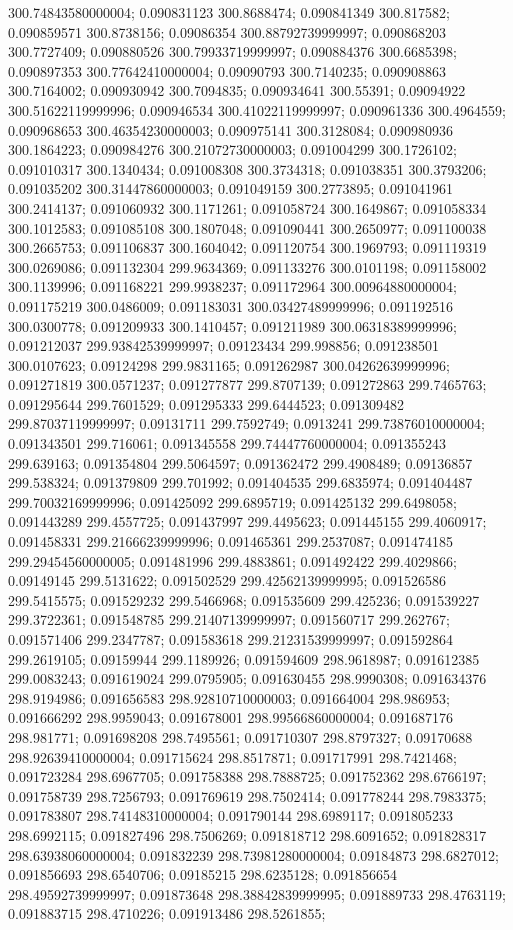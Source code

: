 300.74843580000004; 0.090831123 300.8688474; 0.090841349 300.817582; 0.090859571 300.8738156; 0.09086354 300.88792739999997; 0.090868203 300.7727409; 0.090880526 300.79933719999997; 0.090884376 300.6685398; 0.090897353 300.77642410000004; 0.09090793 300.7140235; 0.090908863 300.7164002; 0.090930942 300.7094835; 0.090934641 300.55391; 0.09094922 300.51622119999996; 0.090946534 300.41022119999997; 0.090961336 300.4964559; 0.090968653 300.46354230000003; 0.090975141 300.3128084; 0.090980936 300.1864223; 0.090984276 300.21072730000003; 0.091004299 300.1726102; 0.091010317 300.1340434; 0.091008308 300.3734318; 0.091038351 300.3793206; 0.091035202 300.31447860000003; 0.091049159 300.2773895; 0.091041961 300.2414137; 0.091060932 300.1171261; 0.091058724 300.1649867; 0.091058334 300.1012583; 0.091085108 300.1807048; 0.091090441 300.2650977; 0.091100038 300.2665753; 0.091106837 300.1604042; 0.091120754 300.1969793; 0.091119319 300.0269086; 0.091132304 299.9634369; 0.091133276 300.0101198; 0.091158002 300.1139996; 0.091168221 299.9938237; 0.091172964 300.00964880000004; 0.091175219 300.0486009; 0.091183031 300.03427489999996; 0.091192516 300.0300778; 0.091209933 300.1410457; 0.091211989 300.06318389999996; 0.091212037 299.93842539999997; 0.09123434 299.998856; 0.091238501 300.0107623; 0.09124298 299.9831165; 0.091262987 300.04262639999996; 0.091271819 300.0571237; 0.091277877 299.8707139; 0.091272863 299.7465763; 0.091295644 299.7601529; 0.091295333 299.6444523; 0.091309482 299.87037119999997; 0.09131711 299.7592749; 0.0913241 299.73876010000004; 0.091343501 299.716061; 0.091345558 299.74447760000004; 0.091355243 299.639163; 0.091354804 299.5064597; 0.091362472 299.4908489; 0.09136857 299.538324; 0.091379809 299.701992; 0.091404535 299.6835974; 0.091404487 299.70032169999996; 0.091425092 299.6895719; 0.091425132 299.6498058; 0.091443289 299.4557725; 0.091437997 299.4495623; 0.091445155 299.4060917; 0.091458331 299.21666239999996; 0.091465361 299.2537087; 0.091474185 299.29454560000005; 0.091481996 299.4883861; 0.091492422 299.4029866; 0.09149145 299.5131622; 0.091502529 299.42562139999995; 0.091526586 299.5415575; 0.091529232 299.5466968; 0.091535609 299.425236; 0.091539227 299.3722361; 0.091548785 299.21407139999997; 0.091560717 299.262767; 0.091571406 299.2347787; 0.091583618 299.21231539999997; 0.091592864 299.2619105; 0.09159944 299.1189926; 0.091594609 298.9618987; 0.091612385 299.0083243; 0.091619024 299.0795905; 0.091630455 298.9990308; 0.091634376 298.9194986; 0.091656583 298.92810710000003; 0.091664004 298.986953; 0.091666292 298.9959043; 0.091678001 298.99566860000004; 0.091687176 298.981771; 0.091698208 298.7495561; 0.091710307 298.8797327; 0.09170688 298.92639410000004; 0.091715624 298.8517871; 0.091717991 298.7421468; 0.091723284 298.6967705; 0.091758388 298.7888725; 0.091752362 298.6766197; 0.091758739 298.7256793; 0.091769619 298.7502414; 0.091778244 298.7983375; 0.091783807 298.74148310000004; 0.091790144 298.6989117; 0.091805233 298.6992115; 0.091827496 298.7506269; 0.091818712 298.6091652; 0.091828317 298.63938060000004; 0.091832239 298.73981280000004; 0.09184873 298.6827012; 0.091856693 298.6540706; 0.09185215 298.6235128; 0.091856654 298.49592739999997; 0.091873648 298.38842839999995; 0.091889733 298.4763119; 0.091883715 298.4710226; 0.091913486 298.5261855; 